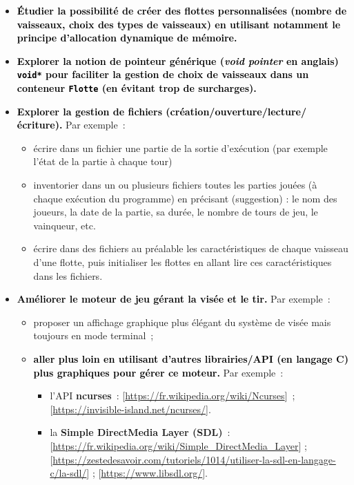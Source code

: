 \documentclass[10pt, fleqn, a4paper]{article}
\newcommand{\bfcolor}[2]{\textcolor{#1}{\textbf{#2}}}
\newcommand\myframecolor{}
\newcommand\mybgcolor{}
\newenvironment{mycolorbox}[2]
{
\def\myframecolor{#1}
\def\mybgcolor{#2}
\begingroup
\begin{lrbox}{\mytextbox}
\begin{minipage}[t]{\textwidth}
}
{
\end{minipage}\end{lrbox}
\fcolorbox{\myframecolor}{\mybgcolor}{\usebox{\mytextbox}}
\endgroup
}
\begin{document}
\begin{mycolorbox}{black}{yellow}
\begin{itemize}
\item[\ding{223}] \bfcolor{black}{Étudier la possibilité de créer des flottes personnalisées (nombre de vaisseaux, choix des types de vaisseaux) en utilisant notamment le principe d'allocation dynamique de mémoire.}
\item[\ding{223}] \bfcolor{black}{Explorer la notion de \og{}pointeur générique\fg{} (\textit{void pointer} en anglais) \texttt{void*} pour faciliter la gestion de choix de vaisseaux dans un conteneur \texttt{Flotte} (en évitant trop de surcharges).}
\item[\ding{223}] \bfcolor{black}{Explorer la gestion de fichiers (création/ouverture/lecture/écriture).} Par exemple~:
\begin{itemize}
\item écrire dans un fichier une partie de la sortie d'exécution (par exemple l'état de la partie à chaque tour)
\item inventorier dans un ou plusieurs fichiers toutes les \og{}parties jouées\fg{} (à chaque exécution du programme) en précisant (suggestion) : le nom des joueurs, la date de la partie, sa durée, le nombre de tours de jeu, le vainqueur, etc.
\item écrire dans des fichiers au préalable les caractéristiques de chaque vaisseau d'une flotte, puis initialiser les flottes en allant lire ces caractéristiques dans les fichiers.
\end{itemize}
\item[\ding{223}] \bfcolor{black}{Améliorer le moteur de jeu gérant la visée et le tir.} Par exemple~:
\begin{itemize}
\item proposer un affichage graphique plus élégant du système de visée mais toujours en mode \og{}terminal\fg{}~;
\item \bfcolor{black}{aller plus loin en utilisant d'autres librairies/API (en langage C) plus graphiques pour gérer ce moteur.} Par exemple~:
\begin{itemize}
\item l'API \bfcolor{redCM}{ncurses}~: [\url{https://fr.wikipedia.org/wiki/Ncurses}]~; [\url{https://invisible-island.net/ncurses/}].
\item la \bfcolor{redCM}{Simple DirectMedia Layer (SDL)}~: [\url{https://fr.wikipedia.org/wiki/Simple_DirectMedia_Layer}] ; [\url{https://zestedesavoir.com/tutoriels/1014/utiliser-la-sdl-en-langage-c/la-sdl/}] ; [\url{https://www.libsdl.org/}].

\end{itemize}
\end{itemize}
\end{itemize}
\end{mycolorbox}
\end{document}
